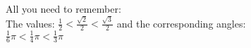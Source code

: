 \documentclass[preview]{standalone}
\begin{document}
\begin{center}
All you need to remember: \\ The values: $ \frac{1}{2} < \frac{\sqrt{2}}{2} < \frac{\sqrt{3}}{2} $ and the corresponding angles: \\ $ \frac{1}{6} \pi < \frac{1}{4} \pi < \frac{1}{3} \pi $
\end{center}
\end{document}
